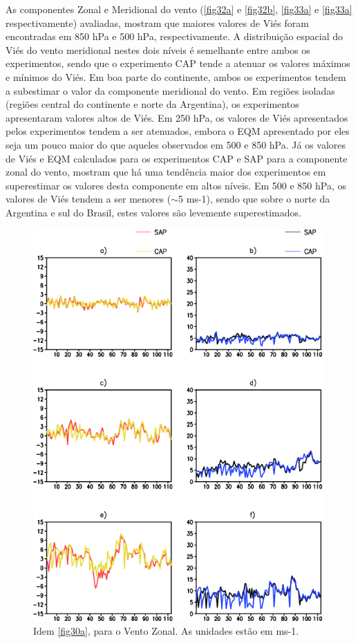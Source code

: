 As componentes Zonal e Meridional do vento (\autoref{fig32a} e \autoref{fig32b}, \autoref{fig33a} e \autoref{fig33a} respectivamente) avaliadas, mostram que maiores valores de Viés foram encontradas em 850 hPa e 500 hPa, respectivamente. A distribuição espacial do Viés do vento meridional nestes dois níveis é semelhante entre ambos os experimentos, sendo que o experimento CAP tende a atenuar os valores máximos e mínimos do Viés. Em boa parte do continente, ambos os experimentos tendem a subestimar o valor da componente meridional do vento. Em regiões isoladas (regiões central do continente e norte da Argentina), os experimentos apresentaram valores altos de Viés. Em 250 hPa, os valores de Viés apresentados pelos experimentos tendem a ser atenuados, embora o EQM apresentado por eles seja um pouco maior do que aqueles observados em 500 e 850 hPa. Já os valores de Viés e EQM calculados para os experimentos CAP e SAP para a componente zonal do vento, mostram que há uma tendência maior dos experimentos em superestimar os valores desta componente em altos níveis. Em 500 e 850 hPa, os valores de Viés tendem a ser menores ($\sim$5 ms-1), sendo que sobre o norte da Argentina e sul do Brasil, estes valores são levemente superestimados.

\begin{figure}[!hbp]
\centering
\includegraphics[height=15cm]{./figs/vies_eqm-uvel.png}
\caption{Idem \autoref{fig30a}, para o Vento Zonal. As unidades estão em ms-1.}
\label{fig32a}
\end{figure}


